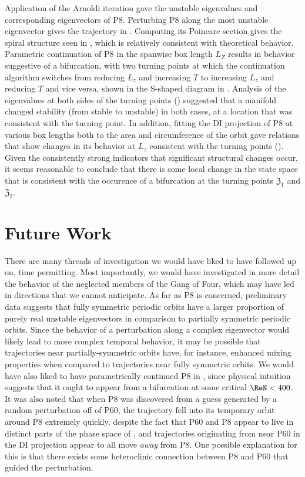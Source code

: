 Application of the Arnoldi iteration gave the unstable eigenvalues and corresponding eigenvectors of P8. Perturbing P8 along the most unstable eigenvector gives the trajectory in . Computing its Poincare section gives the spiral structure seen in , which is relatively consistent with theoretical behavior. Parametric continuation of P8 in the spanwise box length $L_Z$ results in behavior suggestive of a bifurcation, with two turning points at which the continuation algorithm switches from reducing $L_z$ and increasing $T$ to increasing $L_z$ and reducing $T$ and vice versa, shown in the S-shaped diagram in . Analysis of the eigenvalues at both sides of the turning points () suggested that a manifold changed stability (from stable to unstable) in both cases, at a location that was consistent with the turning point.  In addition, fitting the DI projection of P8 at various box lengths both to the area and circumference of the orbit gave relations that show changes in its behavior at $L_z$ consistent with the turning points (). Given the consistently strong indicators that significant structural changes occur, it seems reasonable to conclude that there is some local change in the state space that is consistent with the occurence of a bifurcation at the turning points $\mathfrak{Z}_1$ and $\mathfrak{Z}_2$.\\


\section{Future Work}

There are many threads of investigation we would have liked to have followed up on, time permitting. Most importantly, we would have investigated in more detail the behavior of the neglected members of the Gang of Four, which may have led in directions that we cannot anticipate. As far as P8 is concerned, preliminary data suggests that fully symmetric periodic orbits have a larger proportion of purely real unstable eigenvectors in comparison to partially symmetric periodic orbits. Since the behavior of a perturbation along a complex eigenvector would likely lead to more complex temporal behavior, it may be possible that trajectories near partially-symmetric orbits have, for instance, enhanced mixing properties when compared to trajectories near fully symmetric orbits. We would have also liked to have parametrically continued P8 in \ReN, since physical intuition suggests that it ought to appear from a bifurcation at some critical $\ReN < 400$.  It was also noted that when P8 was discovered from a guess generated by a random perturbation off of P60, the trajectory fell into its temporary orbit around P8 extremely quickly, despite the fact that P60 and P8 appear to live in distinct parts of the phase space of , and trajectories originating from near P60 in the DI projection appear to all move \emph{away} from P8. One possible explanation for this is that there exists some heteroclinic connection between P8 and P60 that guided the perturbation.  